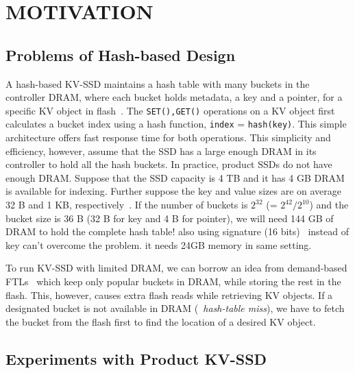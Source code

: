 \documentclass{abstract_hutech}
\begin{document}
\section{MOTIVATION}


\subsection{Problems of Hash-based Design}
\label{sec:hash-kvssd:problem}
A hash-based KV-SSD maintains a hash table with many buckets in the controller DRAM, where each bucket holds metadata, \ie{} a key and a pointer, for a specific KV object in flash~\cite{nvmkv,flashstore,bluecache,kaml}.  
The \texttt{SET(),GET()} operations on a KV object first calculates a bucket index  using a hash function, \ie{} \texttt{index} = \texttt{hash(key)}.
This simple architecture offers fast response time for both operations. This simplicity and efficiency,
however, assume that the SSD has a large enough DRAM in its controller to hold
all the hash buckets.  In practice, product SSDs do not have enough DRAM.
Suppose that the SSD capacity is 4 TB and it has 4 GB DRAM is available for
indexing.  Further suppose the key and value sizes are on average 32 B and 1
KB, respectively~\cite{kvsize}.  If the number of buckets is $2^{32}$ (=
$2^{42}/2^{10}$) and the bucket size is 36 B (32 B for key and 4 B for
pointer), we will need 144 GB of DRAM to hold the complete hash table!
also using signature (16 bits)~\cite{kvsdd} instead of key can't overcome the problem. it needs 24GB memory in same setting. 

To run KV-SSD with limited DRAM, we can borrow an idea from demand-based FTLs~\cite{dftl} which keep only popular buckets in DRAM, while storing the rest in the flash.
This, however, causes extra flash reads while retrieving KV objects. 
If a designated bucket is not available in DRAM (\ie~\textit{hash-table miss}), 
we have to fetch the bucket from the flash first to
find the location of a desired KV object.



\subsection{Experiments with Product KV-SSD}
\label{sec:hash-kvssd:exp}
\end{document}
